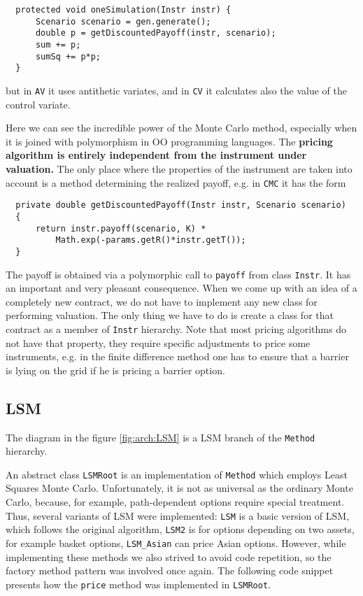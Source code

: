 \documentclass[a4paper,11pt, twoside]{book}
\theoremstyle{definition}
\theoremstyle{remark}
\newcounter{example}[chapter]
\begin{document}
\begin{lstlisting}
  protected void oneSimulation(Instr instr) {
      Scenario scenario = gen.generate();
      double p = getDiscountedPayoff(instr, scenario);
      sum += p;
      sumSq += p*p;
  }
\end{lstlisting}
but in \texttt{AV} it uses antithetic variates, and in \texttt{CV} it calculates also the value of the control variate.

Here we can see the incredible power of the Monte Carlo method, especially when it is joined with polymorphism in OO programming languages. The \textbf{pricing algorithm is entirely independent from the instrument under valuation.} The only place where the properties of the instrument are taken into account is a method determining the realized payoff, e.g. in \texttt{CMC} it has the form

\begin{lstlisting}
  private double getDiscountedPayoff(Instr instr, Scenario scenario)
  { 
      return instr.payoff(scenario, K) *
	      Math.exp(-params.getR()*instr.getT());
  }
\end{lstlisting}

The payoff is obtained via a polymorphic call to \texttt{payoff} from class \texttt{Instr}. It has an important and very pleasant consequence. When we come up with an idea of a completely new contract, we do not have to implement any new class for performing valuation. The only thing we have to do is create a class for that contract as a member of \texttt{Instr} hierarchy. Note that most pricing algorithms do not have that property, they require specific adjustments to price some instruments, e.g. in the finite difference method one has to ensure that a barrier is lying on the grid if he is pricing a barrier option.
   

\subsection{LSM}
The diagram in the figure \ref{fig:arch:LSM} is a LSM branch of the \texttt{Method} hierarchy.

An abstract class \texttt{LSMRoot} is an implementation of \texttt{Method} which employs Least Squares Monte Carlo. Unfortunately,  it is not as universal as the ordinary Monte Carlo, because, for example, path-dependent options require  special treatment. Thus, several variants of LSM were implemented: \texttt{LSM} is a basic version of LSM, which follows the original algorithm, \texttt{LSM2} is for options depending on two assets, for example basket options, \texttt{LSM\_Asian} can price Asian options.
However, while implementing these methods we also strived to avoid code repetition, so the factory method pattern was involved once again. The following code snippet presents how the \texttt{price} method was implemented in \texttt{LSMRoot}.
\end{document}
